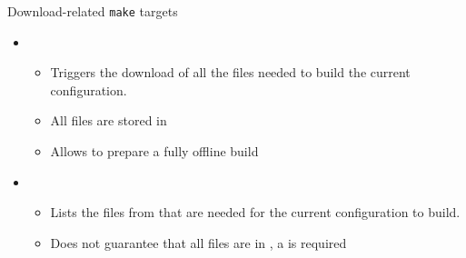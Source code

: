 \begin{frame}{Download-related {\tt make} targets}
  \begin{itemize}
  \item {}
    \begin{itemize}
    \item Triggers the download of all the files needed to build the
      current configuration.
    \item All files are stored in 
    \item Allows to prepare a fully offline build
    \end{itemize}
  \item {}
    \begin{itemize}
    \item Lists the files from  that are needed for
      the current configuration to build.
    \item Does not guarantee that all files are in , a
       is required
    \end{itemize}
  \end{itemize}
\end{frame}
